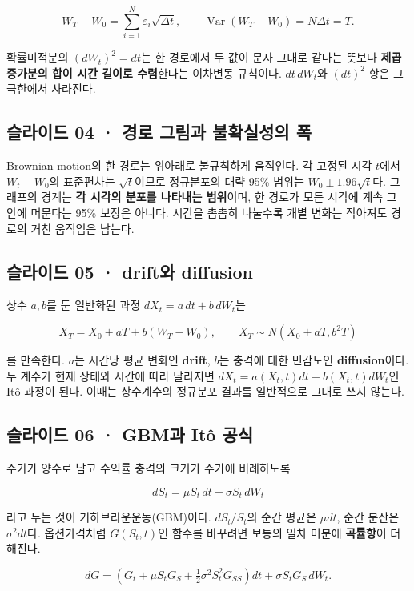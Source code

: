 \documentclass[11pt,a4paper]{article}
\begin{document}
\[
W_T-W_0=\sum_{i=1}^{N}\varepsilon_i\sqrt{\Delta t},\qquad
\operatorname{Var}(W_T-W_0)=N\Delta t=T.
\]

확률미적분의 $(dW_t)^2=dt$는 한 경로에서 두 값이 문자 그대로 같다는 뜻보다 \textbf{제곱 증가분의 합이 시간 길이로 수렴}한다는 이차변동 규칙이다. $dt\,dW_t$와 $(dt)^2$ 항은 그 극한에서 사라진다.\par

\subsection{슬라이드 04 · 경로 그림과 불확실성의 폭}
Brownian motion의 한 경로는 위아래로 불규칙하게 움직인다. 각 고정된 시각 $t$에서 $W_t-W_0$의 표준편차는 $\sqrt t$이므로 정규분포의 대략 95\% 범위는 $W_0\pm1.96\sqrt t$다. 그래프의 경계는 \textbf{각 시각의 분포를 나타내는 범위}이며, 한 경로가 모든 시각에 계속 그 안에 머문다는 95\% 보장은 아니다. 시간을 촘촘히 나눌수록 개별 변화는 작아져도 경로의 거친 움직임은 남는다.\par

\subsection{슬라이드 05 · drift와 diffusion}
상수 $a,b$를 둔 일반화된 과정 $dX_t=a\,dt+b\,dW_t$는\par

\[
X_T=X_0+aT+b(W_T-W_0),\qquad
X_T\sim N(X_0+aT,b^2T)
\]

를 만족한다. $a$는 시간당 평균 변화인 \textbf{drift}, $b$는 충격에 대한 민감도인 \textbf{diffusion}이다. 두 계수가 현재 상태와 시간에 따라 달라지면 $dX_t=a(X_t,t)dt+b(X_t,t)dW_t$인 Itô 과정이 된다. 이때는 상수계수의 정규분포 결과를 일반적으로 그대로 쓰지 않는다.\par

\subsection{슬라이드 06 · GBM과 Itô 공식}
주가가 양수로 남고 수익률 충격의 크기가 주가에 비례하도록\par

\[
dS_t=\mu S_t\,dt+\sigma S_t\,dW_t
\]

라고 두는 것이 기하브라운운동(GBM)이다. $dS_t/S_t$의 순간 평균은 $\mu dt$, 순간 분산은 $\sigma^2dt$다. 옵션가격처럼 $G(S_t,t)$인 함수를 바꾸려면 보통의 일차 미분에 \textbf{곡률항}이 더해진다.\par

\[
dG=\left(G_t+\mu S_tG_S+\tfrac12\sigma^2S_t^2G_{SS}\right)dt
+\sigma S_tG_S\,dW_t.
\]
\end{document}
